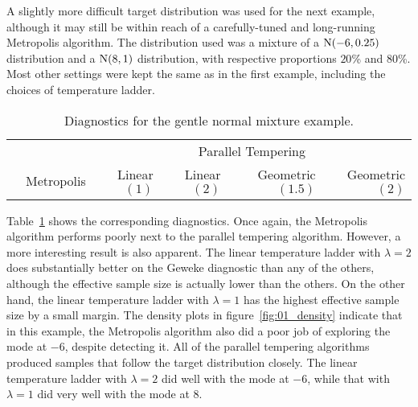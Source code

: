 A slightly more difficult target distribution was used for the next example,
although it may still be within reach of a carefully-tuned and long-running
Metropolis algorithm.
The distribution used was a mixture of a $\operatorname{N}(-6, 0.25)$ distribution
and a $\operatorname{N}(8, 1)$ distribution, with respective proportions $20$\% and
$80$\%.
Most other settings were kept the same as in the first example,
including the choices of temperature ladder.

    \begin{table}[ht]
    \begin{tabular}{lrrrrr}
    \toprule
    & & \multicolumn{4}{c}{Parallel Tempering} \\
    \cmidrule(l){3-6}
    & Metropolis & Linear $(1)$ & Linear $(2)$ 
    & Geometric $(1.5)$ & Geometric $(2)$ \\
    \midrule
    
    \bottomrule
    \end{tabular}
    \caption{
    Diagnostics for the gentle normal mixture example.
    }
    \label{tab:01_diag}
    \end{table}

Table~\ref{tab:01_diag} shows the corresponding diagnostics.
Once again, the Metropolis algorithm performs poorly next to the parallel
tempering algorithm.
However, a more interesting result is also apparent.
The linear temperature ladder with $\lambda = 2$ does substantially better
on the Geweke diagnostic than any of the others, although the effective
sample size is actually lower than the others.
On the other hand, the linear temperature ladder with $\lambda = 1$ has the
highest effective sample size by a small margin.
The density plots in figure~\ref{fig:01_density} indicate that in this example,
the Metropolis algorithm also did a poor job of exploring the mode at $-6$,
despite detecting it.
All of the parallel tempering algorithms produced samples that follow the
target distribution closely.
The linear temperature ladder with $\lambda = 2$ did well with the mode
at $-6$, while that with $\lambda = 1$ did very well with the mode at $8$.

